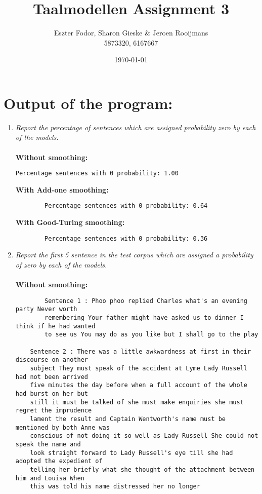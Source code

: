 \documentclass[11pt, a4paper]{article}
\title{Taalmodellen Assignment 3}
\author{Eszter Fodor, Sharon Gieske \& Jeroen Rooijmans \\ 5873320, 6167667}
\date{\today}
\begin{document}
\maketitle

\section*{Output of the program:}
\begin{enumerate}
	\item \textit{Report the percentage of sentences which are assigned probability
	zero by each of the models.}\\\\
	\textbf{Without smoothing:}  \begin{verbatim}Percentage sentences with 0 probability: 1.00 
	\end{verbatim}
	
	\textbf{With Add-one smoothing:} 
	\begin{verbatim}
		Percentage sentences with 0 probability: 0.64
	\end{verbatim}
	
	\textbf{With Good-Turing smoothing:}
	\begin{verbatim}
		Percentage sentences with 0 probability: 0.36
	\end{verbatim}
	
	\item \textit{Report the first 5 sentence in the test corpus which are assigned
	a probability of zero by each of the models.}\\\\
	\textbf{Without smoothing:}
	\begin{verbatim}
		Sentence 1 : Phoo phoo replied Charles what's an evening party Never worth 
		remembering Your father might have asked us to dinner I think if he had wanted 
		to see us You may do as you like but I shall go to the play
		
	Sentence 2 : There was a little awkwardness at first in their discourse on another 
	subject They must speak of the accident at Lyme Lady Russell had not been arrived 
	five minutes the day before when a full account of the whole had burst on her but 
	still it must be talked of she must make enquiries she must regret the imprudence 
	lament the result and Captain Wentworth's name must be mentioned by both Anne was 
	conscious of not doing it so well as Lady Russell She could not speak the name and 
	look straight forward to Lady Russell's eye till she had adopted the expedient of 
	telling her briefly what she thought of the attachment between him and Louisa When 
	this was told his name distressed her no longer
	

\end{verbatim}
\end{enumerate}
\end{document}
